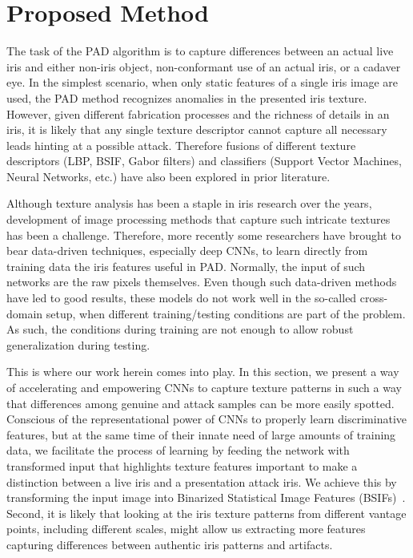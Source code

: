 \section{Proposed Method}
\label{sec:proposed_method}

The task of the PAD algorithm is to capture differences between an actual live iris and either non-iris object, non-conformant use of an actual iris, or a cadaver eye. In the simplest scenario, when only static features of a single iris image are used, the PAD method recognizes anomalies in the presented iris texture. However, given different fabrication processes and the richness of details in an iris, it is likely that any single texture descriptor cannot capture all necessary leads hinting at a possible attack. Therefore fusions of different texture descriptors (\eg LBP, BSIF, Gabor filters) and classifiers (\eg Support Vector Machines, Neural Networks, etc.) have also been explored in prior literature.

Although texture analysis has been a staple in iris research over the years, development of image processing methods that capture such intricate textures has been a challenge. Therefore, more recently some researchers have brought to bear data-driven techniques, especially deep CNNs, to learn directly from training data the 
iris features useful in PAD. Normally, the input of such networks are the raw pixels themselves. Even though such data-driven methods have led to good results, these models do not work well in the so-called cross-domain setup, \ie when different training/testing conditions are part of the problem. As such, the conditions during training are not enough to allow robust generalization during testing.

This is where our work herein comes into play. In this section, we present a way of accelerating and empowering CNNs to capture texture patterns in such a way that differences among genuine and attack samples can be more easily spotted. Conscious of the representational power of CNNs to properly learn discriminative features, but at the same time of their innate need of large amounts of training data, we facilitate the process of learning by feeding the network with transformed input that highlights texture features important to make a distinction between a live iris and a presentation attack iris. We achieve this by transforming the input image into Binarized Statistical Image Features (BSIFs)~\cite{kannala2012bsif}. Second, 
it is likely that looking at the iris texture patterns from different vantage points, including different scales, might allow us extracting more features capturing differences between authentic iris patterns and artifacts. 

